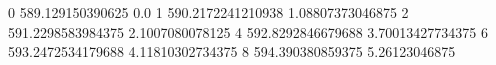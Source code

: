 0 589.129150390625 0.0
1 590.2172241210938 1.08807373046875
2 591.2298583984375 2.1007080078125
4 592.8292846679688 3.70013427734375
6 593.2472534179688 4.11810302734375
8 594.390380859375 5.26123046875
